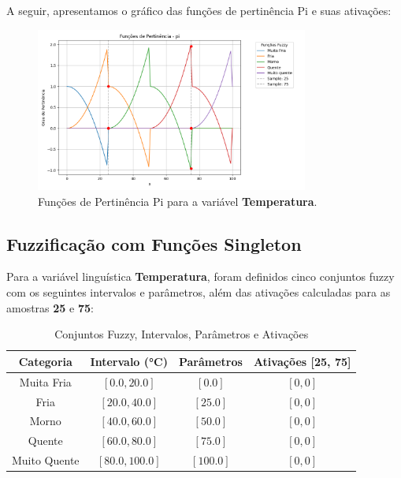 \documentclass[a4paper,12pt]{article}
\begin{document}
A seguir, apresentamos o gráfico das funções de pertinência Pi e suas ativações:

\begin{figure}[H]
    \centering
    \includegraphics[width=0.8\textwidth]{img/funções_de_pertinência_pi_fuzzificado.png}
    \caption{Funções de Pertinência Pi para a variável \textbf{Temperatura}.}
\end{figure}

\subsection{Fuzzificação com Funções Singleton}

Para a variável linguística \textbf{Temperatura}, foram definidos cinco conjuntos fuzzy com os seguintes intervalos e parâmetros, além das ativações calculadas para as amostras \textbf{25} e \textbf{75}:

\begin{table}[H]
\centering
\caption{Conjuntos Fuzzy, Intervalos, Parâmetros e Ativações}
\begin{tabular}{|c|c|c|c|}
\hline
\textbf{Categoria}    & \textbf{Intervalo (°C)} & \textbf{Parâmetros}       & \textbf{Ativações [25, 75]} \\ \hline
Muita Fria            & $[0.0, 20.0]$          & $[0.0]$                   & $[0, 0]$                   \\ \hline
Fria                  & $[20.0, 40.0]$         & $[25.0]$                  & $[0, 0]$                   \\ \hline
Morno                 & $[40.0, 60.0]$         & $[50.0]$                  & $[0, 0]$                   \\ \hline
Quente                & $[60.0, 80.0]$         & $[75.0]$                  & $[0, 0]$                   \\ \hline
Muito Quente          & $[80.0, 100.0]$        & $[100.0]$                 & $[0, 0]$                   \\ \hline
\end{tabular}
\end{table}
\end{document}
